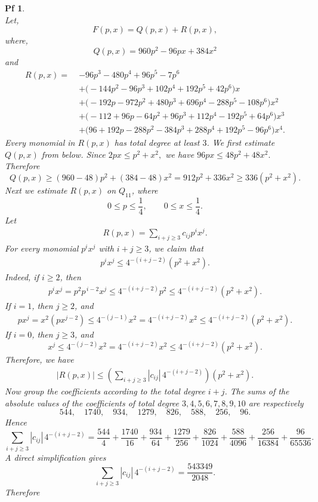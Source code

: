 \documentclass[10pt,a4paper]{amsart}
\newtheorem{pf}{Pf}
\begin{document}
\begin{pf}
\[\]
Let, 
\[
F(p,x)=Q(p,x)+R(p,x),
\]
where,
\[
Q(p,x)=960p^2-96px+384x^2
\]
and
\[
\begin{aligned}
R(p,x)=\;&-96p^3-480p^4+96p^5-7p^6 \\
&+\bigl(-144p^2-96p^3+102p^4+192p^5+42p^6\bigr)x \\
&+\bigl(-192p-972p^2+480p^3+696p^4-288p^5-108p^6\bigr)x^2 \\
&+\bigl(-112+96p-64p^2+96p^3+112p^4-192p^5+64p^6\bigr)x^3 \\
&+\bigl(96+192p-288p^2-384p^3+288p^4+192p^5-96p^6\bigr)x^4.
\end{aligned}
\]
Every monomial in $R(p, x)$ has total degree at least $3$.
We first estimate $Q(p, x)$ from below. Since
$
2px\le p^2+x^2,
$
we have
$
96px\le 48p^2+48x^2.
$
Therefore
\[
Q(p,x)\ge (960-48)p^2+(384-48)x^2
=912p^2+336x^2
\ge 336(p^2+x^2).
\]
Next we estimate $R(p, x)$ on $Q_{11}$, where
\[
0\le p\le \frac14,\qquad 0\le x\le \frac14.
\]
Let
\begin{align*}
R(p,x)=\sum_{i+j\ge 3} c_{ij}p^i x^j.
\end{align*}
For every monomial $p^i x^j$ with $i+j\ge 3$, we claim that
\begin{align*}
p^i x^j \le 4^{-(i+j-2)}(p^2+x^2).
\end{align*}
Indeed, if \(i\ge 2\), then
\begin{align*}
p^i x^j=p^2 p^{\,i-2}x^j\le 4^{-(i+j-2)}p^2
\le 4^{-(i+j-2)}(p^2+x^2).
\end{align*}
If $i=1$, then $j\ge 2$, and
\begin{align*}
px^j=x^2(px^{j-2})\le 4^{-(j-1)}x^2
=4^{-(i+j-2)}x^2
\le 4^{-(i+j-2)}(p^2+x^2).
\end{align*}
If \(i=0\), then \(j\ge 3\), and
\[
x^j\le 4^{-(j-2)}x^2
=4^{-(i+j-2)}x^2
\le 4^{-(i+j-2)}(p^2+x^2).
\]
Therefore, we have 
\begin{align*}
|R(p,x)|
\le
\left(\sum_{i+j\ge 3}|c_{ij}|\,4^{-(i+j-2)}\right)(p^2+x^2).
\end{align*}
Now group the coefficients according to the total degree \(i+j\).
The sums of the absolute values of the coefficients of total degree
\(3,4,5,6,7,8,9,10\) are respectively
\[
544,\quad 1740,\quad 934,\quad 1279,\quad 826,\quad 588,\quad 256,\quad 96.
\]
Hence
\[
\sum_{i+j\ge 3}|c_{ij}|\,4^{-(i+j-2)}
=
\frac{544}{4}
+\frac{1740}{16}
+\frac{934}{64}
+\frac{1279}{256}
+\frac{826}{1024}
+\frac{588}{4096}
+\frac{256}{16384}
+\frac{96}{65536}.
\]
A direct simplification gives
\[
\sum_{i+j\ge 3}|c_{ij}|\,4^{-(i+j-2)}
=
\frac{543349}{2048}.
\]
Therefore

\end{pf}
\end{document}

